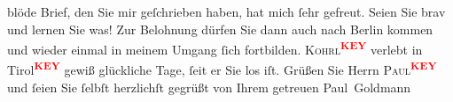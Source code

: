 \begin{ledgroupsized}[t]{13cm}
               blöde Brief, den Sie mir geſchrieben haben, hat mich ſehr gefreut. Seien Sie brav und
               lernen Sie was! Zur Belohnung dürfen Sie dann auch  nach Berlin kommen und wieder
               einmal in meinem Umgang ſich fortbilden. \textsc{Kohrl\textcolor{red}{\textsuperscript{\textbf{KEY}}}} verlebt in Tirol\textcolor{red}{\textsuperscript{\textbf{KEY}}} gewiß glückliche Tage, ſeit er
               Sie los iſt. Grüßen Sie Herrn \textsc{Paul\textcolor{red}{\textsuperscript{\textbf{KEY}}}} und ſeien Sie ſelbſt herzlichſt gegrüßt von Ihrem getreuen \spacefill\mbox{Paul
                  Goldmann}\pend
           
         
         \endnumbering{}\end{ledgroupsized}\begin{anhang}\end{anhang}\newcommand{\dateiname}{L03536}\newcommand{\titel}{Paul Goldmann an Olga XXXX Gussmann/Schnitzler, 10. 12. [XXXX]}\newcommand{\editorInnen}{Martin Anton Müller und Laura Untner}
      